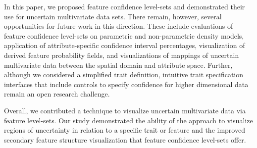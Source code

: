 In this paper, we proposed feature confidence level-sets and demonstrated their use for uncertain multivariate  data sets.
%
There remain, however, several opportunities for future work in this direction.
%
These include evaluations of feature confidence level-sets on
parametric and non-parametric density models, application of attribute-specific confidence interval percentages, 
visualization of derived feature probability fields, and visualizations of mappings of uncertain multivariate data between the spatial domain and attribute space.
%
Further, although we considered a simplified trait definition, intuitive trait specification interfaces 
that include controls to specify confidence for higher dimensional data remain an open research challenge. 

Overall, we contributed a technique to visualize uncertain multivariate data via feature level-sets.
%
Our study demonstrated the ability of the approach to visualize regions of uncertainty in relation to a specific trait or feature and the improved  secondary feature structure visualization that feature confidence level-sets offer.
